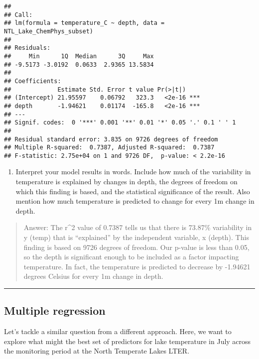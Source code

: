 \documentclass[
]{article}
\providecommand{\tightlist}{%
  \setlength{\itemsep}{0pt}\setlength{\parskip}{0pt}}
\begin{document}
\begin{verbatim}
## 
## Call:
## lm(formula = temperature_C ~ depth, data = NTL_Lake_ChemPhys_subset)
## 
## Residuals:
##     Min      1Q  Median      3Q     Max 
## -9.5173 -3.0192  0.0633  2.9365 13.5834 
## 
## Coefficients:
##             Estimate Std. Error t value Pr(>|t|)    
## (Intercept) 21.95597    0.06792   323.3   <2e-16 ***
## depth       -1.94621    0.01174  -165.8   <2e-16 ***
## ---
## Signif. codes:  0 '***' 0.001 '**' 0.01 '*' 0.05 '.' 0.1 ' ' 1
## 
## Residual standard error: 3.835 on 9726 degrees of freedom
## Multiple R-squared:  0.7387, Adjusted R-squared:  0.7387 
## F-statistic: 2.75e+04 on 1 and 9726 DF,  p-value: < 2.2e-16
\end{verbatim}

\begin{enumerate}
\def\labelenumi{\arabic{enumi}.}
\setcounter{enumi}{7}
\tightlist
\item
  Interpret your model results in words. Include how much of the
  variability in temperature is explained by changes in depth, the
  degrees of freedom on which this finding is based, and the statistical
  significance of the result. Also mention how much temperature is
  predicted to change for every 1m change in depth.
\end{enumerate}

\begin{quote}
Answer: The r\^{}2 value of 0.7387 tells us that there is 73.87\%
variability in y (temp) that is ``explained'' by the independent
variable, x (depth). This finding is based on 9726 degrees of freedom.
Our p-value is less than 0.05, so the depth is significant enough to be
included as a factor impacting temperature. In fact, the temperature is
predicted to decrease by -1.94621 degrees Celsius for every 1m change in
depth.
\end{quote}

\begin{center}\rule{0.5\linewidth}{0.5pt}\end{center}

\hypertarget{multiple-regression}{%
\subsection{Multiple regression}\label{multiple-regression}}

Let's tackle a similar question from a different approach. Here, we want
to explore what might the best set of predictors for lake temperature in
July across the monitoring period at the North Temperate Lakes LTER.
\end{document}
